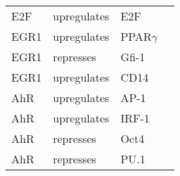 \begin{center}
\begin{scriptsize}
\begin{supertabular}{|p{3cm}|p{3cm}|p{3cm}|p{3cm}|}
E2F &  upregulates & E2F & \cite{Johnson1994}\\
EGR1 &  upregulates & PPAR$\gamma$ & \cite{Fu2002}\\
EGR1 &  represses & Gfi-1 & \cite{Mak2011}\\
EGR1 &  upregulates & CD14 & \cite{Chen2004}\\
AhR &  upregulates & AP-1 & \cite{Suh2002}\\
AhR &  upregulates & IRF-1 & \cite{Shen2011}\\
AhR & represses & Oct4 & \cite{Bunaciu2011}\\
AhR & represses & PU.1 & \\

\hline
\end{supertabular}
\end{scriptsize}
\end{center}
%






